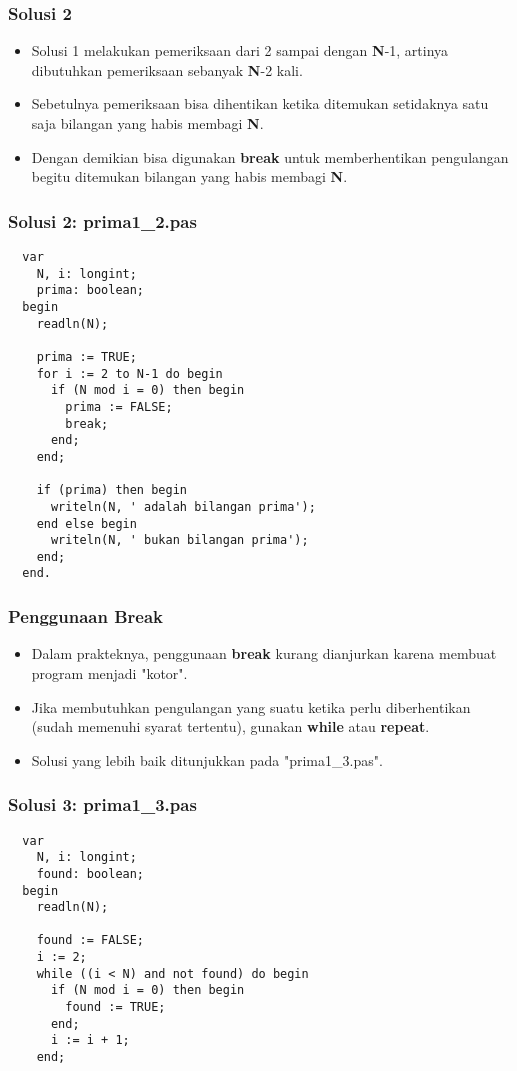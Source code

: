 \begin{frame}
\frametitle{Solusi 2}
\begin{itemize}
  \item Solusi 1 melakukan pemeriksaan dari 2 sampai dengan \textbf{N}-1, artinya dibutuhkan pemeriksaan sebanyak \textbf{N}-2 kali.
  \item Sebetulnya pemeriksaan bisa dihentikan ketika ditemukan setidaknya satu saja bilangan yang habis membagi \textbf{N}.
  \item Dengan demikian bisa digunakan \textbf{break} untuk memberhentikan pengulangan begitu ditemukan bilangan yang habis membagi \textbf{N}.
\end{itemize}
\end{frame}

\begin{frame}[fragile]
\frametitle{Solusi 2: prima1\_2.pas}
\begin{lstlisting}
  var
    N, i: longint;
    prima: boolean;
  begin
    readln(N);

    prima := TRUE;
    for i := 2 to N-1 do begin
      if (N mod i = 0) then begin
        prima := FALSE;
        break;
      end;
    end;

    if (prima) then begin
      writeln(N, ' adalah bilangan prima');
    end else begin
      writeln(N, ' bukan bilangan prima');
    end;
  end.
\end{lstlisting}
\end{frame}

\begin{frame}
\frametitle{Penggunaan Break}
\begin{itemize}
  \item Dalam prakteknya, penggunaan \textbf{break} kurang dianjurkan karena membuat program menjadi "kotor".
  \item Jika membutuhkan pengulangan yang suatu ketika perlu diberhentikan (sudah memenuhi syarat tertentu), gunakan \textbf{while} atau \textbf{repeat}.
  \item Solusi yang lebih baik ditunjukkan pada "prima1\_3.pas".
\end{itemize}
\end{frame}

\begin{frame}[fragile]
\frametitle{Solusi 3: prima1\_3.pas}
\begin{lstlisting}
  var
    N, i: longint;
    found: boolean;
  begin
    readln(N);

    found := FALSE;
    i := 2;
    while ((i < N) and not found) do begin
      if (N mod i = 0) then begin
        found := TRUE;
      end;
      i := i + 1;
    end;
\end{lstlisting}
\end{frame}

